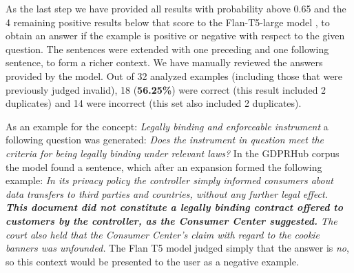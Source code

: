 As the last step we have provided all results with probability above 0.65 and the 4 remaining positive results below that score
to the Flan-T5-large model \cite{wei2021finetuned,raffel2020exploring}, to obtain an answer if the example is positive or negative
with respect to the given question. The sentences were extended with one preceding and one following sentence, to form a richer context.
We have manually reviewed the answers provided by the model. Out of 32 analyzed examples (including those  
that were previously judged invalid), 18 (\textbf{56.25\%}) were correct (this result included 2 duplicates) and 14 were incorrect (this set
also included 2 duplicates). 

As an example for the concept: \textit{Legally binding and enforceable
instrument} a following question was generated: \textit{Does the instrument in
question meet the criteria for being legally binding under relevant laws?}
In the GDPRHub corpus the model found a sentence, which after an expansion formed
the following example: \textit{In its privacy policy the controller simply
informed consumers about data transfers to third parties and countries, without
any further legal effect.  \textbf{This document did not constitute a legally binding
contract offered to customers by the controller, as the Consumer Center
suggested.} The court also held that the Consumer Center's claim with regard to
the cookie banners was unfounded.} The Flan T5 model judged simply that the
answer is \textit{no}, so this context would be presented to the user as a
negative example.